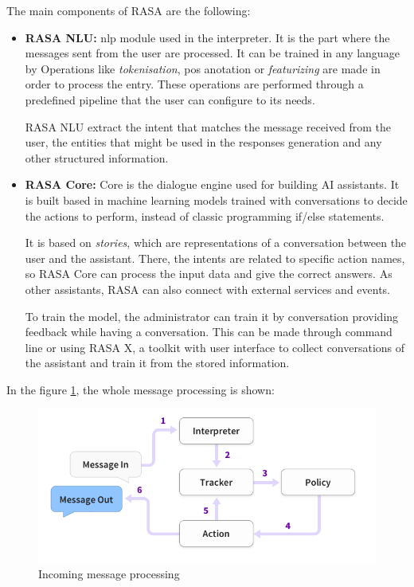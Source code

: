The main components of RASA are the following:
\begin{itemize}
    \item \textbf{RASA NLU:} \acl{nlp} module used in the interpreter. It is the part where the messages sent from the user are processed. It can be trained in any language by  Operations like \textsl{tokenisation}, \acf{pos} anotation or \textsl{featurizing} are made in order to process the entry. These operations are performed through a predefined pipeline that the user can configure to its needs.
    
    RASA NLU extract the intent that matches the message received from the user, the entities that might be used in the responses generation and any other structured information.
    
    \item \textbf{RASA Core:} Core is the dialogue engine used for building AI assistants. It is built based in machine learning models trained with conversations to decide the actions to perform, instead of classic programming if/else statements.
    
    It is based on \textsl{stories}, which are representations of a conversation between the user and the assistant. There, the intents are related to specific action names, so RASA Core can process the input data and give the correct answers. As other assistants, RASA can also connect with external services and events.
    
    To train the model, the administrator can train it by conversation providing feedback while having a conversation. This can be made through command line or using RASA X, a toolkit with user interface to collect conversations of the assistant and train it from the stored information\cite{rasax}.
\end{itemize}

In the figure \ref{fig:rasa_msg}, the whole message processing is shown:
\begin{figure}[ht]
\includegraphics[scale=0.8]{docs/img/project_pics/rasa_message.png}
\centering
\caption{Incoming message processing \cite{dialogflow_overview}}
\label{fig:rasa_msg}
\end{figure}


